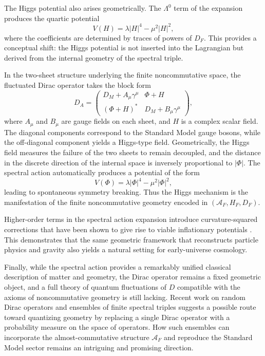 \documentclass[11pt]{article}
\theoremstyle{plain}
\begin{document}
The Higgs potential also arises geometrically.  The $\Lambda^{0}$ term of the
expansion produces the quartic potential
\[
V(H)=\lambda |H|^{4}-\mu^{2}|H|^{2},
\]
where the coefficients are determined by traces of powers of $D_{F}$.  This
provides a conceptual shift: the Higgs potential is not inserted into the
Lagrangian but derived from the internal geometry of the spectral triple.

In the two-sheet structure underlying the finite noncommutative space, the
fluctuated Dirac operator takes the block form
\[
D_{A}=
\begin{pmatrix}
D_{M}+A_{\mu}\gamma^{\mu} & \Phi + H \\
(\Phi + H)^{\ast} & D_{M}+B_{\mu}\gamma^{\mu}
\end{pmatrix},
\]
where $A_{\mu}$ and $B_{\mu}$ are gauge fields on each sheet, and $H$ is a
complex scalar field.  The diagonal components correspond to the Standard Model
gauge bosons, while the off-diagonal component yields a Higgs-type field.
Geometrically, the Higgs field measures the failure of the two sheets to remain
decoupled, and the distance in the discrete direction of the internal space is
inversely proportional to $|\Phi|$.  The spectral action automatically produces
a potential of the form
\[
V(\Phi)=\lambda |\Phi|^{4}-\mu^{2}|\Phi|^{2},
\]
leading to spontaneous symmetry breaking.  Thus the Higgs mechanism is the
manifestation of the finite noncommutative geometry encoded in $(\mathcal{A}_{F},H_{F},D_{F})$.

Higher-order terms in the spectral action expansion introduce curvature-squared
corrections that have been shown to give rise to viable inflationary potentials
\cite{Marcolli2012, Marcolli2017, Marcolli2019}.  This demonstrates that the
same geometric framework that reconstructs particle physics and gravity also
yields a natural setting for early-universe cosmology.

Finally, while the spectral action provides a remarkably unified classical
description of matter and geometry, the Dirac operator remains a fixed
geometric object, and a full theory of quantum fluctuations of $D$ compatible
with the axioms of noncommutative geometry is still lacking.  Recent work on
random Dirac operators and ensembles of finite spectral triples suggests a
possible route toward quantizing geometry by replacing a single Dirac operator
with a probability measure on the space of operators.  How such ensembles can
incorporate the almost-commutative structure $\mathcal{A}_{F}$ and reproduce
the Standard Model sector remains an intriguing and promising direction.
\end{document}
